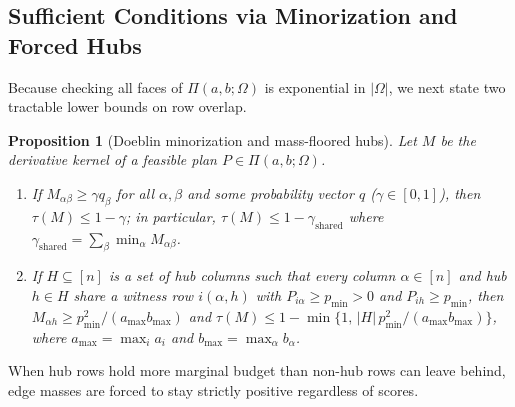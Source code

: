 \documentclass[10pt]{article}
\newtheorem{proposition}{Proposition}
\begin{document}
\subsection{Sufficient Conditions via Minorization and Forced Hubs}

Because checking all faces of $\Pi(a,b;\Omega)$ is exponential in $|\Omega|$, we next state two tractable lower bounds on row overlap.

\begin{proposition}[Doeblin minorization and mass-floored hubs]
\label{prop:minorization-hubs}
Let $M$ be the derivative kernel of a feasible plan $P \in \Pi(a,b;\Omega)$.
\begin{enumerate}[leftmargin=1.5em]
  \item If $M_{\alpha\beta} \ge \gamma q_\beta$ for all $\alpha,\beta$ and some probability vector $q$ ($\gamma \in [0,1]$), then $\tau(M) \le 1 - \gamma$; in particular, $\tau(M) \le 1 - \gamma_{\mathrm{shared}}$ where $\gamma_{\mathrm{shared}} = \sum_\beta \min_\alpha M_{\alpha\beta}$.
  \item If $H \subseteq [n]$ is a set of hub columns such that every column $\alpha \in [n]$ and hub $h \in H$ share a witness row $i(\alpha,h)$ with $P_{i\alpha} \ge p_{\min} > 0$ and $P_{ih} \ge p_{\min}$, then $M_{\alpha h} \ge p_{\min}^2 / (a_{\max} b_{\max})$ and $\tau(M) \le 1 - \min\{1,\, |H|\, p_{\min}^2 / (a_{\max} b_{\max})\}$, where $a_{\max} = \max_i a_i$ and $b_{\max} = \max_\alpha b_\alpha$.
\end{enumerate}
\end{proposition}

When hub rows hold more marginal budget than non-hub rows can leave behind, edge masses are forced to stay strictly positive regardless of scores.
\end{document}
